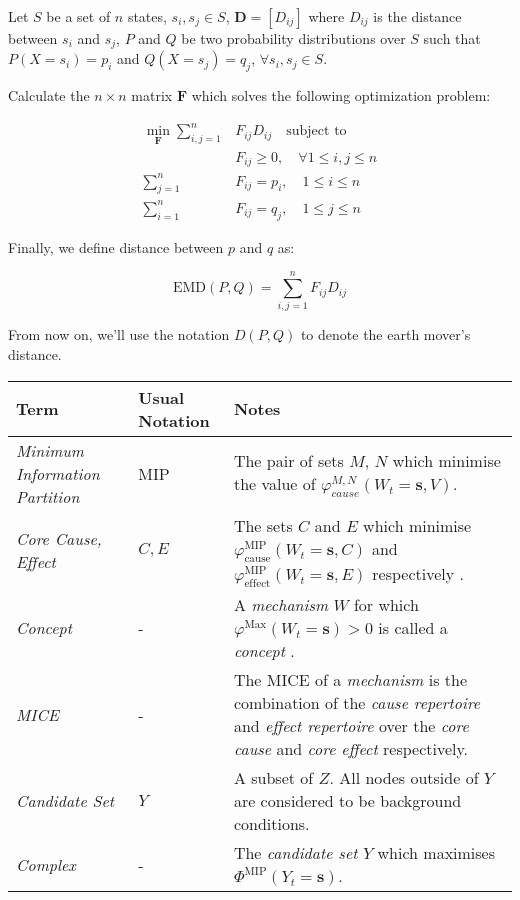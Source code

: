 \begin{definition}
	\label{def:emd}
	 Let $S$ be a set of $n$ states, $s_i, s_j \in S$, $\mathbf{D} = \left[ D_{ij}\right]$ where $D_{ij}$ is the distance between $s_i$ and $s_j$, $P$ and $Q$ be two probability distributions over $S$ such that $P(X = s_i) = p_i$ and $Q(X=s_j) = q_j$, $\forall s_i, s_j \in S$. 
	
	Calculate the $n\times n$ matrix $\mathbf{F}$ which solves the following optimization problem:
	
	\begin{align}
	\label{eq:EMD1}
	\min \limits_{\mathbf{F}}\sum \limits_{i,j=1}^n &F_{ij} D_{ij}\quad \text{subject to}\\
	&F_{ij}\geq 0,\quad \forall 1 \leq i,j \leq n\\
	\sum \limits_{j=1}^n &F_{ij} = p_i,\quad 1 \leq i \leq n\\
	\sum \limits_{i=1}^n &F_{ij} = q_j,\quad 1 \leq j \leq n
	\end{align}
	
	Finally, we define distance between $p$ and $q$ as: 
	
	\begin{equation}
	\label{def:EMD}
	\text{EMD}(P, Q) = \sum \limits_{i,j=1}^{n} F_{ij} D_{ij}
	\end{equation}
\end{definition}

From now on, we'll use the notation $D(P,Q)$ to denote the earth mover's distance.

\begin{tabularx}{\textwidth}{ll X}
	Term & Usual Notation & Notes \\
	\hline
	\endfirsthead
	\hline
	\endhead
	\endfoot
	\hline
	\caption{Key Definitions and Notation} 
	\label{tab:defs2}
	\endlastfoot
	\textit{Minimum Information Partition} & MIP & The pair of sets $M$, $N$ which minimise the value of $\varphi_{cause}^{M,N}(W_t=\mathbf{s}, V)$.\\
	\hline
	\textit{Core Cause, Effect} & $C, E$ & The sets $C$ and $E$ which minimise $\varphi^{\text{MIP}}_{\text{cause}}(W_t = \mathbf{s}, C)$ and $\varphi^{\text{MIP}}_{\text{effect}}(W_t = \mathbf{s}, E)$ respectively . \\
	\hline
	\textit{Concept} & - & A \textit{mechanism} $W$ for which $\varphi^{\text{Max}}(W_t =\mathbf{s})>0$ is called a \textit{concept} .\\
	\hline
	\textit{MICE} & - & The MICE of a \textit{mechanism} is the combination of the \textit{cause repertoire} and \textit{effect repertoire} over the \textit{core cause} and \textit{core effect} respectively. \\
	\hline
	\textit{Candidate Set} & $Y$ & A subset of $Z$. All nodes outside of $Y$ are considered to be background conditions.\\
	\hline
	\textit{Complex} & - & The \textit{candidate set} $Y$ which maximises $\Phi^{\text{MIP}} (Y_t = \mathbf{s})$.\\
	\hline
\end{tabularx}

